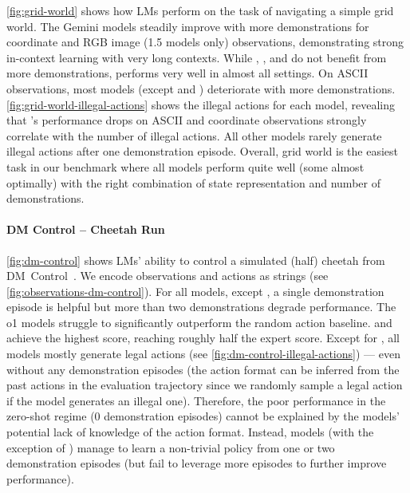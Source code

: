 \cref{fig:grid-world} shows how LMs perform on the task of navigating a simple grid world.
The Gemini models steadily improve with more demonstrations for coordinate and RGB image (1.5 models only) observations, demonstrating strong in-context learning with very long contexts.
While \gpt{}, \mini{}, and \preview{} do not benefit from more demonstrations, \oone{} performs very well in almost all settings.
On ASCII observations, most models (except \oone{} and \flash{}) deteriorate with more demonstrations.
\cref{fig:grid-world-illegal-actions} shows the illegal actions for each model, revealing that \preview{}'s performance drops on ASCII and coordinate observations strongly correlate with the number of illegal actions.
All other models rarely generate illegal actions after one demonstration episode.
Overall, grid world is the easiest task in our benchmark where all models perform quite well (some almost optimally) with the right combination of state representation and number of demonstrations.

\paragraph{DM Control -- Cheetah Run}

\cref{fig:dm-control} shows LMs' ability to control a simulated (half) cheetah from DM~Control~\citep{tassa2018deepmind}.
We encode observations and actions as strings (see \cref{fig:observations-dm-control}).
For all models, except \mini{}, a single demonstration episode is helpful but more than two demonstrations degrade performance.
The o1 models struggle to significantly outperform the random action baseline.
\pro{} and \expflash{} achieve the highest score, reaching roughly half the expert score.
Except for \mini{}, all models mostly generate legal actions (see \cref{fig:dm-control-illegal-actions}) --- even without any demonstration episodes (the action format can be inferred from the past actions in the evaluation trajectory since we randomly sample a legal action if the model generates an illegal one).
Therefore, the poor performance in the zero-shot regime (\ie $0$ demonstration episodes) cannot be explained by the models' potential lack of knowledge of the action format.
Instead, models (with the exception of \mini{}) manage to learn a non-trivial policy from one or two demonstration episodes (but fail to leverage more episodes to further improve performance).

